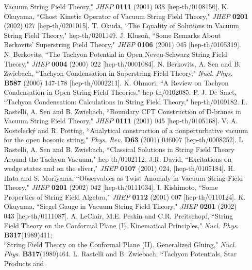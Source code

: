 \documentclass[a4paper,12pt]{article}
\begin{document}
\begin{thebibliography}{999}
 Vacuum String Field Theory," \textit{JHEP} \textbf{0111} (2001) 038 [hep-th/0108150].
K. Okuyama, ``Ghost Kinetic Operator of Vacuum String Field Theory," \textit{JHEP} 
 \textbf{0201} (2002) 027 [hep-th/0201015]. 
T. Okuda, ``The Equality of Solutions in Vacuum String Field Theory," hep-th/0201149. 
J. Kluso\v{n}, ``Some Remarks About Berkovits' Superstring Field Theory," \textit{JHEP} 
 \textbf{0106} (2001) 045 [hep-th/0105319].
N. Berkovits, ``The Tachyon Potential in Open Neveu-Schwarz String 
 Field Theory," \textit{JHEP} \textbf{0004} (2000) 022 [hep-th/0001084].
N. Berkovits, A. Sen and B. Zwiebach, ``Tachyon Condensation in 
 Superstring Field Theory," \textit{Nucl. Phys.} \textbf{B587} (2000) 147-178 [hep-th/0002211].
K. Ohmori, ``A Review on Tachyon Condensation in Open String Field Theories," 
 hep-th/0102085.
P.-J. De Smet, ``Tachyon Condensation: Calculations in String Field Theory," hep-th/0109182.
L. Rastelli, A. Sen and B. Zwiebach, ``Boundary CFT Construction of D-branes 
 in Vacuum String Field Theory," \textit{JHEP} \textbf{0111} (2001) 045 [hep-th/0105168]. 
V. A. Kosteleck\'{y} and R. Potting, ``Analytical construction 
 of a nonperturbative vacuum for the open bosonic string," \textit{Phys. Rev.} 
 \textbf{D63} (2001) 046007 [hep-th/0008252].
L. Rastelli, A. Sen and B. Zwiebach, ``Classical Solutions in String Field Theory  
 Around the Tachyon Vacuum," hep-th/0102112.
J.R. David, ``Excitations on wedge states and on the sliver," \textit{JHEP} \textbf{0107} 
 (2001) 024, [hep-th/0105184].
H. Hata and S. Moriyama, ``Observables as Twist Anomaly in Vacuum String Field Theory," 
 \textit{JHEP} \textbf{0201} (2002) 042 [hep-th/0111034].
I. Kishimoto, ``Some Properties of String Field Algebra," \textit{JHEP} \textbf{0112} 
 (2001) 007 [hep-th/0110124].
K. Okuyama, ``Siegel Gauge in Vacuum String Field Theory," \textit{JHEP} 
 \textbf{0201} (2002) 043 [hep-th/0111087].
A. LeClair, M.E. Peskin and C.R. Preitschopf, ``String Field 
 Theory on the Conformal Plane (I). Kinematical Principles," 
 \textit{Nucl. Phys.} \textbf{B317}(1989)411; \vspace{1mm} \\ 
 ``String Field Theory on the Conformal Plane (II). Generalized 
 Gluing," \textit{Nucl. Phys.} \textbf{B317}(1989)464.
L. Rastelli and B. Zwiebach, ``Tachyon Potentials, Star Products and 

\end{thebibliography}
\end{document}
